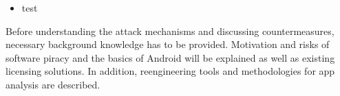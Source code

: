 \begin{itemize}
    \item test
\end{itemize}
Before understanding the attack mechanisms and discussing countermeasures, necessary background knowledge has to be provided.
Motivation and risks of software piracy and the basics of Android will be explained as well as existing licensing solutions. In addition, reengineering tools and methodologies for app analysis are described.
